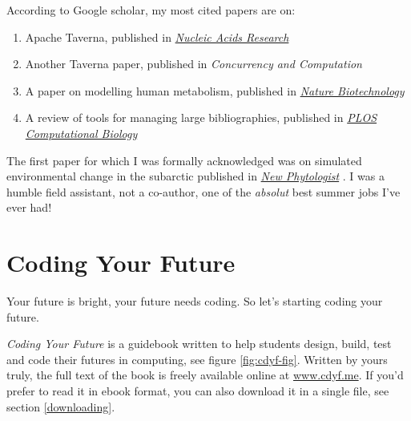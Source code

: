 \documentclass[
  12pt,
]{book}
\providecommand{\tightlist}{%
  \setlength{\itemsep}{0pt}\setlength{\parskip}{0pt}}
\begin{document}
According to Google scholar, my most cited papers are on:

\begin{enumerate}
\def\labelenumi{\arabic{enumi}.}
\tightlist
\item
  Apache Taverna, published in \href{https://en.wikipedia.org/wiki/Nucleic_Acids_Research}{\emph{Nucleic Acids Research}} \citep{taverna}\\
\item
  Another Taverna paper, published in \emph{Concurrency and Computation} \citep{Oinn2006}\\
\item
  A paper on modelling human metabolism, published in \href{https://en.wikipedia.org/wiki/Nature_Biotechnology}{\emph{Nature Biotechnology}} \citep{Thiele2013}
\item
  A review of tools for managing large bibliographies, published in \href{https://en.wikipedia.org/wiki/PLOS_Computational_Biology}{\emph{PLOS Computational Biology}} \citep{defrosting}
\end{enumerate}

The first paper for which I was formally acknowledged was on simulated environmental change in the subarctic published in \href{https://en.wikipedia.org/wiki/New_Phytologist}{\emph{New Phytologist}} \citep{subarctic}. I was a humble field assistant, not a co-author, one of the \emph{absolut} best summer jobs I've ever had!

\hypertarget{coding-your-future}{%
\chapter{Coding Your Future}\label{coding-your-future}}

Your future is bright, your future needs coding. So let's starting coding your future.

\emph{Coding Your Future} is a guidebook written to help students design, build, test and code their futures in computing, see figure \ref{fig:cdyf-fig}. Written by yours truly, \citep{cdyf} the full text of the book is freely available online at \href{https://www.cdyf.me}{www.cdyf.me}. If you'd prefer to read it in ebook format, you can also download it in a single file, see section \ref{downloading}.
\end{document}
